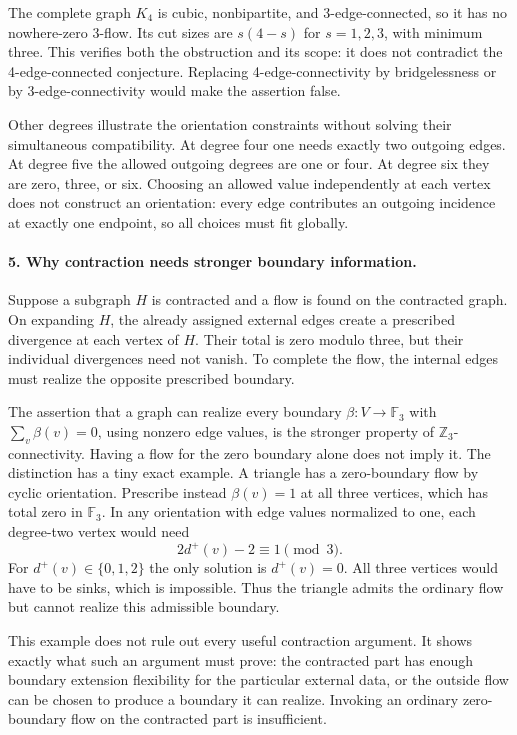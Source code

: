 \documentclass[11pt]{article}
\begin{document}
The complete graph $K_4$ is cubic, nonbipartite, and 3-edge-connected, so it has no nowhere-zero 3-flow. Its cut sizes are $s(4-s)$ for $s=1,2,3$, with minimum three. This verifies both the obstruction and its scope: it does not contradict the 4-edge-connected conjecture. Replacing 4-edge-connectivity by bridgelessness or by 3-edge-connectivity would make the assertion false.

Other degrees illustrate the orientation constraints without solving their simultaneous compatibility. At degree four one needs exactly two outgoing edges. At degree five the allowed outgoing degrees are one or four. At degree six they are zero, three, or six. Choosing an allowed value independently at each vertex does not construct an orientation: every edge contributes an outgoing incidence at exactly one endpoint, so all choices must fit globally.

\paragraph{5. Why contraction needs stronger boundary information.}
Suppose a subgraph $H$ is contracted and a flow is found on the contracted graph. On expanding $H$, the already assigned external edges create a prescribed divergence at each vertex of $H$. Their total is zero modulo three, but their individual divergences need not vanish. To complete the flow, the internal edges must realize the opposite prescribed boundary.

The assertion that a graph can realize every boundary $\beta:V\to\mathbb F_3$ with $\sum_v\beta(v)=0$, using nonzero edge values, is the stronger property of $\mathbb Z_3$-connectivity. Having a flow for the zero boundary alone does not imply it. The distinction has a tiny exact example. A triangle has a zero-boundary flow by cyclic orientation. Prescribe instead $\beta(v)=1$ at all three vertices, which has total zero in $\mathbb F_3$. In any orientation with edge values normalized to one, each degree-two vertex would need
\[
 2d^+(v)-2\equiv1\pmod3.
\]
For $d^+(v)\in\{0,1,2\}$ the only solution is $d^+(v)=0$. All three vertices would have to be sinks, which is impossible. Thus the triangle admits the ordinary flow but cannot realize this admissible boundary.

This example does not rule out every useful contraction argument. It shows exactly what such an argument must prove: the contracted part has enough boundary extension flexibility for the particular external data, or the outside flow can be chosen to produce a boundary it can realize. Invoking an ordinary zero-boundary flow on the contracted part is insufficient.
\end{document}
